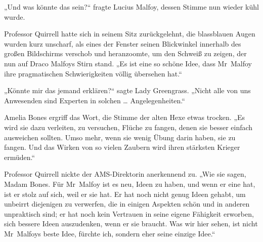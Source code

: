 „Und was könnte das sein?“ fragte Lucius Malfoy, dessen Stimme nun wieder kühl wurde.

Professor Quirrell hatte sich in seinem Sitz zurückgelehnt, die blassblauen Augen wurden kurz unscharf, als eines der Fenster seinen Blickwinkel innerhalb des großen Bildschirms verschob und heranzoomte, um den Schweiß zu zeigen, der nun auf Draco Malfoys Stirn stand.
„Es ist eine so schöne Idee, dass Mr~Malfoy ihre pragmatischen Schwierigkeiten völlig übersehen hat.“

„Könnte mir das jemand erklären?“ sagte Lady Greengrass.
„Nicht alle von uns Anwesenden sind Experten in solchen … Angelegenheiten.“

Amelia Bones ergriff das Wort, die Stimme der alten Hexe etwas trocken.
„Es wird sie dazu verleiten, zu versuchen, Flüche zu fangen, denen sie besser einfach ausweichen sollten. Umso mehr, wenn sie wenig Übung darin haben, sie zu fangen. Und das Wirken von so vielen Zaubern wird ihren stärksten Krieger ermüden.“

Professor Quirrell nickte der AMS-Direktorin anerkennend zu.
„Wie sie sagen, Madam Bones. Für Mr~Malfoy ist es neu, Ideen zu haben, und wenn er eine hat, ist er stolz auf sich, weil er sie hat. Er hat noch nicht genug Ideen gehabt, um unbeirrt diejenigen zu verwerfen, die in einigen Aspekten schön und in anderen unpraktisch sind; er hat noch kein Vertrauen in seine eigene Fähigkeit erworben, sich bessere Ideen auszudenken, wenn er sie braucht. Was wir hier sehen, ist nicht Mr~Malfoys beste Idee, fürchte ich, sondern eher seine einzige Idee.“

